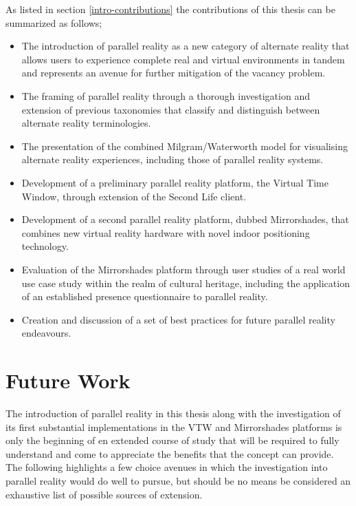 As listed in section \ref{intro-contributions} the contributions of this thesis can be summarized as follows;

\begin{itemize}
	\item The introduction of parallel reality as a new category of alternate reality that allows users to experience complete real and virtual environments in tandem and represents an avenue for further mitigation of the vacancy problem.
	\item The framing of parallel reality through a thorough investigation and extension of previous taxonomies that classify and distinguish between alternate reality terminologies.
	\item The presentation of the combined Milgram/Waterworth model for visualising alternate reality experiences, including those of parallel reality systems.
	\item Development of a preliminary parallel reality platform, the Virtual Time Window, through extension of the Second Life client.
	\item Development of a second parallel reality platform, dubbed Mirrorshades, that combines new virtual reality hardware with novel indoor positioning technology.
	\item Evaluation of the Mirrorshades platform through user studies of a real world use case study within the realm of cultural heritage, including the application of an established presence questionnaire to parallel reality.
	\item Creation and discussion of a set of best practices for future parallel reality endeavours.
\end{itemize}


\section{Future Work}

The introduction of parallel reality in this thesis along with the investigation of its first substantial implementations in the VTW and Mirrorshades platforms is only the beginning of en extended course of study that will be required to fully understand and come to appreciate the benefits that the concept can provide. The following highlights a few choice avenues in which the investigation into parallel reality would do well to pursue, but should be no means be considered an exhaustive list of possible sources of extension.

